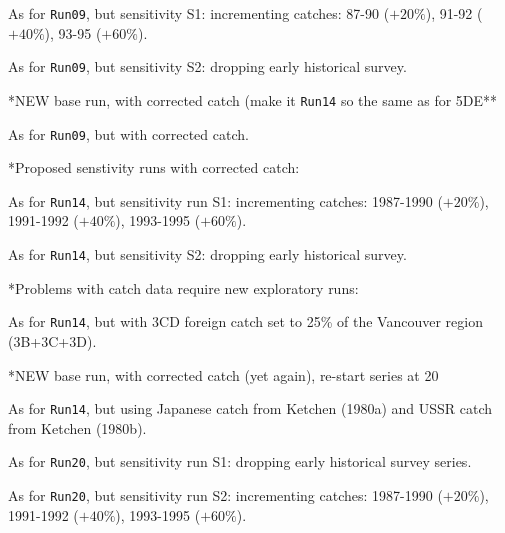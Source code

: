  As for {\tt Run09}, but sensitivity S1: incrementing catches: 87-90 ($+20\%$), 91-92 ($+40\%$), 93-95 ($+60\%$).  \newline

 As for {\tt Run09}, but sensitivity S2: dropping early historical survey.  \newline

\noindent **NEW base run, with corrected catch (make it {\tt Run14} so the same as for 5DE**

 As for {\tt Run09}, but with corrected catch. \newline

\noindent **Proposed senstivity runs with corrected catch:

 As for {\tt Run14}, but sensitivity run S1: incrementing catches: 1987-1990 ($+20\%$), 1991-1992 ($+40\%$), 1993-1995 ($+60\%$).  \newline

 As for {\tt Run14}, but sensitivity S2: dropping early historical survey.  \newline

\noindent **Problems with catch data require new exploratory runs:

 As for {\tt Run14}, but with 3CD foreign catch set to 25\% of the Vancouver region (3B+3C+3D). \newline

\noindent **NEW base run, with corrected catch (yet again), re-start series at 20

 As for {\tt Run14}, but using Japanese catch from Ketchen (1980a) and USSR catch from Ketchen (1980b). \newline

 As for {\tt Run20}, but sensitivity run S1: dropping early historical survey series.  \newline

 As for {\tt Run20}, but sensitivity run S2: incrementing catches: 1987-1990 ($+20\%$), 1991-1992 ($+40\%$), 1993-1995 ($+60\%$).  \newline








